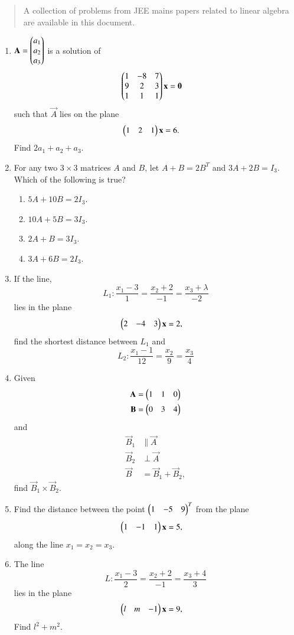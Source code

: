 \documentclass[journal,12pt,twocolumn]{IEEEtran}
\begin{document}
\begin{abstract}
	A  collection of problems from JEE mains papers related to linear algebra are available in this document.  
\end{abstract}
\begin{enumerate}[label=\arabic*.]
\item  $\mathbf{A} = \begin{pmatrix}a_1 \\ a_2 \\ a_3\end{pmatrix}$ is a solution of
\begin{align}
\begin{pmatrix}1 & -8 & 7 \\ 9 & 2 & 3 \\ 1 & 1 & 1\end{pmatrix}\mathbf{x} &= \mathbf{0}
\end{align}
%
such that $\vec{A}$ lies on the plane
\begin{align}
\begin{pmatrix}1 & 2 & 1\end{pmatrix}\mathbf{x} &= 6.
\end{align}
%
Find $2a_1+a_2+a_3$.
\item For any two $3 \times 3$ matrices $A$ and $B$, let $A+B = 2B^T$ and $3A+2B=I_3$.  Which of the following 
is true?
\begin{enumerate}
\item $5A+10B=2I_3$.
\item $10A+5B=3I_3$.
\item $2A+B=3I_3$.
\item $3A+6B=2I_3$.
\end{enumerate}
%
\item If the line, 
\begin{equation}
L_1:\frac{x_1-3}{1}=
\frac{x_2+2}{-1} = 
\frac{x_3+\lambda}{-2}
\end{equation}
lies in the plane
\begin{align}
\begin{pmatrix}2 & -4 & 3\end{pmatrix}\mathbf{x} &= 2,
\end{align}
find the shortest distance between $L_1$ and
\begin{equation}
L_2:\frac{x_1-1}{12}=
\frac{x_2}{9} = 
\frac{x_3}{4}
\end{equation}
\item Given
\begin{align}
\mathbf{A} = \begin{pmatrix}1 & 1 & 0\end{pmatrix}
\\
\mathbf{B} = \begin{pmatrix}0 & 3 & 4\end{pmatrix}
\end{align}
and 
\begin{align}
\vec{B}_1&\parallel \vec{A}
\\
\vec{B}_2 &\perp \vec{A}
\\
\vec{B} &= \vec{B}_1+\vec{B}_2,
\end{align}
find $\vec{B}_1\times \vec{B}_2$.
\item Find the distance between the point $\begin{pmatrix}1 & -5 & 9\end{pmatrix}^T$ from the plane 
\begin{align}
\begin{pmatrix}1 & -1 & 1\end{pmatrix}\mathbf{x} &= 5,
\end{align}
along the line $x_1=x_2=x_3$.
\item The line
\begin{equation}
L:\frac{x_1-3}{2}=
\frac{x_2+2}{-1} = 
\frac{x_3+4}{3}
\end{equation}
lies in the plane
\begin{align}
\begin{pmatrix}l & m & -1\end{pmatrix}\mathbf{x} &= 9,
\end{align}
%
Find $l^2+m^2$.


\end{enumerate}
\end{document}
